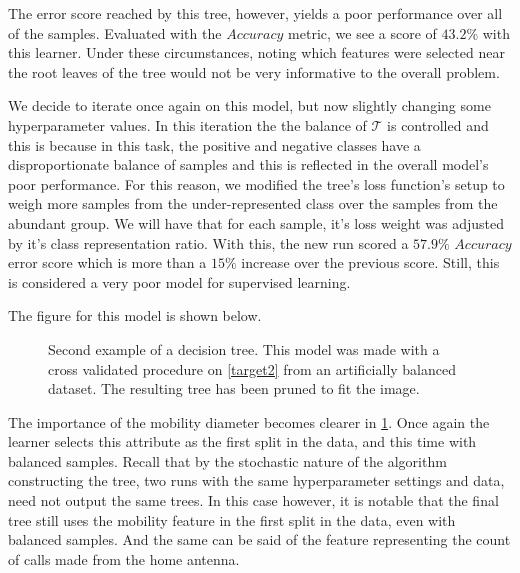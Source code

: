 The error score reached by this tree, however, yields a poor performance over all of the samples.
Evaluated with the $Accuracy$ metric, we see a score of $43.2\%$ with this learner.
Under these circumstances, noting which features were selected near the root leaves of the tree would not be very informative to the overall problem.

We decide to iterate once again on this model, but now slightly changing some hyperparameter values.
In this iteration the the balance of $\mathcal{T}$ is controlled and this is because in this task, the positive and negative classes have a disproportionate balance of samples and this is reflected in the overall model's poor performance.
For this reason, we modified the tree's loss function's setup to weigh more samples from the under-represented class over the samples from the abundant group.
We will have that for each sample, it's loss weight was adjusted by it's class representation ratio.
With this, the new run scored a $57.9\%$ $Accuracy$ error score which is more than a $15\%$ increase over the previous score.
Still, this is considered a very poor model for supervised learning.

The figure for this model is shown below.

\bigskip

\begin{figure}
    \centering
    \caption{ Second example of a decision tree.
        This model was made with a cross validated procedure on \cref{target2} from an artificially balanced dataset.
        The resulting tree has been pruned to fit the image.}
    \label{fig:decision_tree_actual_problem2}
\end{figure}


\smallskip

The importance of the mobility diameter becomes clearer in \cref{fig:decision_tree_actual_problem2}.
Once again the learner selects this attribute as the first split in the data, and this time with balanced samples.
Recall that by the stochastic nature of the algorithm constructing the tree, two runs with the same hyperparameter settings and data, need not output the same trees.
In this case however, it is notable that the final tree still uses the mobility feature in the first split in the data, even with balanced samples.
And the same can be said of the feature representing the count of calls made from the home antenna.

